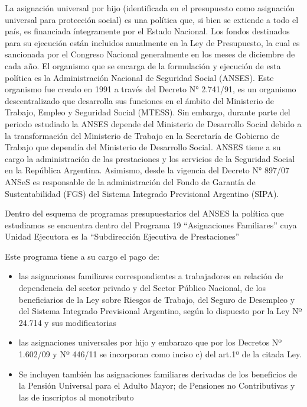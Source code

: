 \documentclass[
  12,
]{article}
\begin{document}
La asignación universal por hijo (identificada en el presupuesto como
asignación universal para protección social) es una política que, si
bien se extiende a todo el país, es financiada íntegramente por el
Estado Nacional. Los fondos destinados para su ejecución están incluidos
anualmente en la Ley de Presupuesto, la cual es sancionada por el
Congreso Nacional generalmente en los meses de diciembre de cada año. El
organismo que se encarga de la formulación y ejecución de esta política
es la Administración Nacional de Seguridad Social (ANSES). Este
organismo fue creado en 1991 a través del Decreto N° 2.741/91, es un
organismo descentralizado que desarrolla sus funciones en el ámbito del
Ministerio de Trabajo, Empleo y Seguridad Social (MTESS). Sin embargo,
durante parte del periodo estudiado la ANSES depende del Ministerio de
Desarrollo Social debido a la transformación del Ministerio de Trabajo
en la Secretaría de Gobierno de Trabajo que dependía del Ministerio de
Desarrollo Social. ANSES tiene a su cargo la administración de las
prestaciones y los servicios de la Seguridad Social en la República
Argentina. Asimismo, desde la vigencia del Decreto N° 897/07 ANSeS es
responsable de la administración del Fondo de Garantía de
Sustentabilidad (FGS) del Sistema Integrado Previsional Argentino
(SIPA).

Dentro del esquema de programas presupuestarios del ANSES la política
que estudiamos se encuentra dentro del Programa 19 ``Asignaciones
Familiares'' cuya Unidad Ejecutora es la ``Subdirección Ejecutiva de
Prestaciones''

Este programa tiene a su cargo el pago de:

\begin{itemize}
\item
  las asignaciones familiares correspondientes a trabajadores en
  relación de dependencia del sector privado y del Sector Público
  Nacional, de los beneficiarios de la Ley sobre Riesgos de Trabajo, del
  Seguro de Desempleo y del Sistema Integrado Previsional Argentino,
  según lo dispuesto por la Ley Nº 24.714 y sus modificatorias
\item
  las asignaciones universales por hijo y embarazo que por los Decretos
  Nº 1.602/09 y Nº 446/11 se incorporan como inciso c) del art.1º de la
  citada Ley.
\item
  Se incluyen también las asignaciones familiares derivadas de los
  beneficios de la Pensión Universal para el Adulto Mayor; de Pensiones
  no Contributivas y las de inscriptos al monotributo
\end{itemize}
\end{document}
